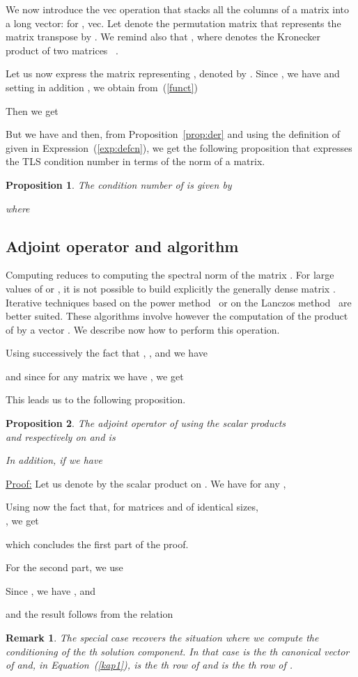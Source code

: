\documentclass[a4paper]{article}
\newcommand{\finproof}{\begin{flushright}  \end{flushright}}
\newtheorem{propos}{Proposition}
\newtheorem{Remark}{Remark}
\begin{document}
We now introduce the vec operation that stacks all the columns of a matrix into
a long vector:  for , vec.
Let  denote the permutation matrix that represents
the matrix transpose by .  We remind also that
, where  denotes the Kronecker product of two matrices
~\cite[p. 21]{KRONECKER}.

Let us now express the matrix representing , denoted by .
Since , we have
 and setting in addition , we obtain from~(\ref{funct})

Then we get

But we have  and then, from Proposition~\ref{prop:der}
and using the definition of  given in Expression~(\ref{exp:defcn}),
we get the following proposition that expresses the TLS condition number in terms of the norm of a matrix.
\begin{propos}
\label{propcn}
The condition number of  is given by

where

\end{propos}
\subsection{Adjoint operator and algorithm}\label{sec:adj}
Computing  reduces to computing the spectral norm
of the  matrix . For large values of
 or , it is not possible to build explicitly the generally
dense matrix . Iterative techniques based on the power method~\cite[p. 289]{HIGHAM} or on the
Lanczos  method~\cite{GOLUB} are better suited. These algorithms
involve however the computation of the product of  by a
vector . We describe now how to perform this operation.

Using successively the fact that , ,
 and  we have

and since for any matrix  we have , we get


This leads us to the following proposition.
\begin{propos}
\label{prop:adj}
The adjoint operator of  using the scalar products\\
 and  respectively on
 and  is

In addition,  if  we have

\end{propos}

{
\underline{Proof:}
Let us denote by   the scalar product  on .
We have  for any ,

Using now the fact that, for matrices  and  of identical sizes,\\
,
we get

which concludes the first part of the proof.

For the second part, we
use

Since , we have , and

and the result follows from the relation 
\finproof
}
\begin{Remark}
{\rm
The special case  recovers the situation where we compute the conditioning
of the th solution component.
In that case  is the th canonical vector of  and, in
Equation~(\ref{kap1}),
 is the th row of  and
 is the th row of .
}
\end{Remark}
\end{document}

